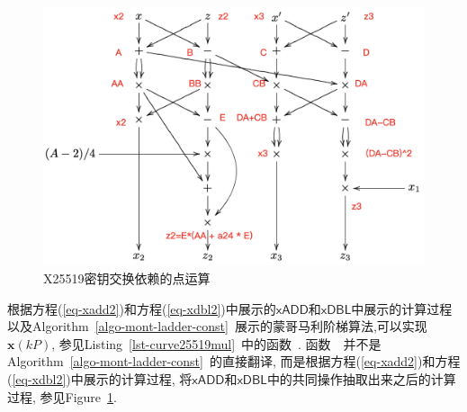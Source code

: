 \begin{figure}[h]
\centering
\includegraphics[width=.8\textwidth]{x-coordiniate-add.png}
\caption{X25519密钥交换依赖的点运算}\label{fig-xadd}
\end{figure}

根据方程(\ref{eq-xadd2})和方程(\ref{eq-xdbl2})中展示的$\textsf{xADD}$和$\textsf{xDBL}$中展示的计算过程
以及Algorithm~\ref{algo-mont-ladder-const}~展示的蒙哥马利阶梯算法,可以实现$\mathbf{x}(kP)$, 
参见Listing~\ref{lst-curve25519mul}~中的函数~.
函数~~并不是Algorithm~\ref{algo-mont-ladder-const}~的直接翻译,
而是根据方程(\ref{eq-xadd2})和方程(\ref{eq-xdbl2})中展示的计算过程,
将$\textsf{xADD}$和$\textsf{xDBL}$中的共同操作抽取出来之后的计算过程, 参见Figure~\ref{fig-xadd}.

